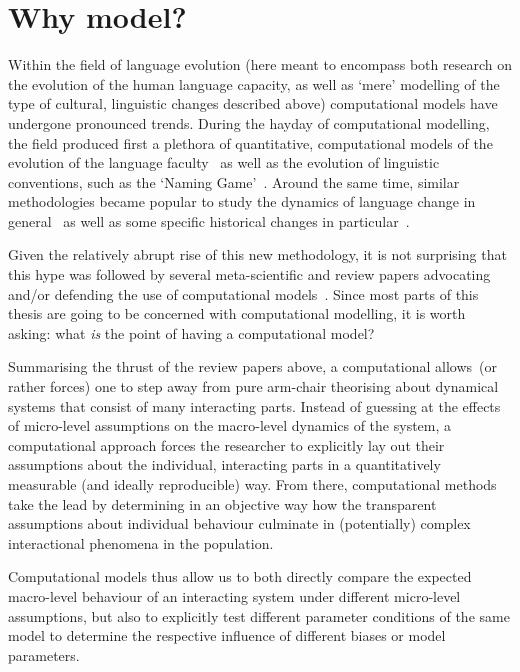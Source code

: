 \section{Why model?}

Within the field of language evolution (here meant to encompass both research on the evolution of the human language capacity, as well as `mere' modelling of the type of cultural, linguistic changes described above) computational models have undergone pronounced trends. %
During the hayday of computational modelling, the field produced first a plethora of quantitative, computational models of the evolution of the language faculty~\citep{Kirby1999,Nowak2001a} as well as the evolution of linguistic conventions, such as the `Naming Game'~\citep[see \citet{Wellens2012} for a review]{Baronchelli2008}. Around the same time, similar methodologies became popular to study the dynamics of language change in general~\citep{Niyogi1995,Niyogi1997,Wedel2006,Baxter2006,Wedel2007,Fagyal2010,Blythe2012,Pierrehumbert2014} as well as some specific historical changes in particular~\citep{Baxter2009,Sonderegger2010,Swarup2012,Kirby2013,Kirby2013cogsci}. %

Given the relatively abrupt rise of this new methodology, it is not surprising that this hype was followed by several meta-scientific and review papers advocating and/or defending the use of computational models~\citep{DeBoer2006,Baker2008,Jaeger2009,Hruschka2009,Vogt2010,DeBoer2012EvoLang}. Since most parts of this thesis are going to be concerned with computational modelling, it is worth asking: what \emph{is} the point of having a computational model?

Summarising the thrust of the review papers above, a computational allows~(or rather forces) one to step away from pure arm-chair theorising about dynamical systems that consist of many interacting parts. Instead of guessing at the effects of micro-level assumptions on the macro-level dynamics of the system, a computational approach forces the researcher to explicitly lay out their assumptions about the individual, interacting parts in a quantitatively measurable (and ideally reproducible) way. From there, computational methods take the lead by determining in an objective way how the transparent assumptions about individual behaviour culminate in (potentially) complex interactional phenomena in the population.

Computational models thus allow us to both directly compare the expected macro-level behaviour of an interacting system under different micro-level assumptions, but also to explicitly test different parameter conditions of the same model to determine the respective influence of different biases or model parameters.

